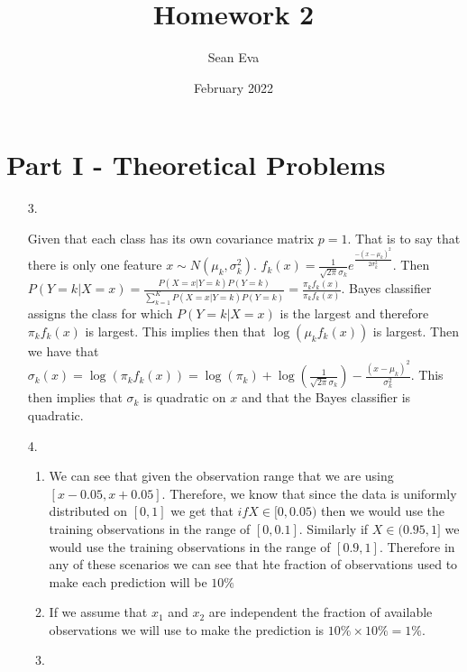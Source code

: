 \documentclass{article}
\title{Homework 2}
\author{Sean Eva}
\date{February 2022}
\begin{document}
\maketitle

\section{Part I - Theoretical Problems}

\begin{enumerate}
    \item [3.]
    
    Given that each class has its own covariance matrix $p=1$. That is to say that there is only one feature $x\sim N (\mu_k, \sigma_k^2)$. $f_k(x) = \frac{1}{\sqrt{2\pi}\sigma_k}e^{\frac{-(x-\mu_k)^2}{2\sigma_k^2}}$. Then $P(Y=k|X=x) = \frac{P(X=x|Y=k)P(Y=k)}{\sum_{k=1}^KP(X=x|Y=k)P(Y=k)} = \frac{\pi_kf_k(x)}{\pi_kf_k(x)}$. Bayes classifier assigns the class for which $P(Y=k|X=x)$ is the largest and therefore $\pi_kf_k(x)$ is largest. This implies then that $\log(\mu_kf_k(x))$ is largest. Then we have that $\sigma_k(x) = \log(\pi_kf_k(x)) = \log(\pi_k)+\log(\frac{1}{\sqrt{2\pi}\sigma_k})-\frac{(x-\mu_k)^2}{\sigma_k^2}.$ This then implies that $\sigma_k$ is quadratic on $x$ and that the Bayes classifier is quadratic.
    
    \item [4.]
    
    \begin{enumerate}
        \item 
        
        We can see that given the observation range that we are using $[x-0.05, x+0.05].$ Therefore, we know that since the data is uniformly distributed on $[0,1]$ we get that $if X\in [0, 0.05)$ then we would use the training observations in the range of $[0, 0.1]$. Similarly if $X\in (0.95, 1]$ we would use the training observations in the range of $[0.9, 1].$ Therefore in any of these scenarios we can see that hte fraction of observations used to make each prediction will be $10\%$
        
        \item
        
        If we assume that $x_1$ and $x_2$ are independent the fraction of available observations we will use to make the prediction is $10\% \times 10\% = 1\%.$
        
        \item
        

\end{enumerate}
\end{enumerate}
\end{document}
